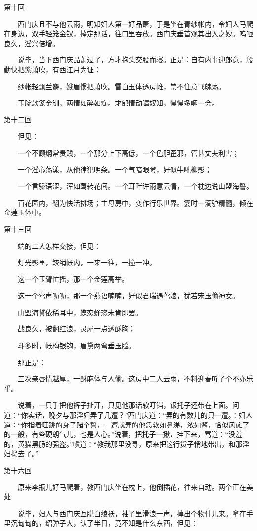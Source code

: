 第十回

　　西门庆且不与他云雨，明知妇人第一好品萧，于是坐在青纱帐内，令妇人马爬在身边，双手轻笼金钗，捧定那话，往口里吞放。西门庆垂首观其出入之妙。呜咂良久，淫兴倍增。


　　说毕，当下西门庆品萧过了，方才抱头交股而寝。正是：自有内事迎郎意，殷勤快把紫萧吹，有西江月为证：

　　纱帐轻飘兰麝，娥眉惯把萧吹。雪白玉体透房帷，禁不住意飞魄荡。

　　玉腕款笼金钏，两情如醉如痴。才郎情动嘱奴知，慢慢多咂一会。


第十二回

　　但见：

　　一个不顾纲常贵贱，一个那分上下高低，一个色胆歪邪，管甚丈夫利害；

　　一个淫心荡漾，从他律犯明条。一个气喑眼瞪，好似牛吼柳影；

　　一个言骄语涩，浑如莺转花间。一个耳畔许雨意云情，一个枕边说山盟海誓。

　　百花园内，翻为快活排场；主母房中，变作行乐世界。霎时一滴驴精髓，倾在金莲玉体中。

第十三回

　　端的二人怎样交接，但见：

　　灯光影里，鲛绡帐内，一来一往，一撞一冲。

　　这一个玉臂忙摇，那一个金莲高举。

　　这一个莺声呖呖，那一个燕语喃喃，好似君瑞遇莺娘，犹若宋玉偷神女。

　　山盟海誓依稀耳中，蝶恋蜂恣未肯即罢。

　　战良久，被翻红浪，灵犀一点透酥胸；

　　斗多时，帐构银钩，眉黛两弯垂玉脸。

　　那正是：

　　三次亲唇情越厚，一酥麻体与人偷。这房中二人云雨，不料迎春听了个不亦乐乎。


　　说着，一只手把他裤子扯开，只见他那话软叮铛，银托子还带在上面。问道：“你实话，晚夕与那淫妇弄了几遭？”西门庆道：“弄的有数儿的只一遭。：妇人道：“你指着旺跳的身子赌个誓，一遭就弄的他恁软如鼻涕，浓如酱，恰似风瘫了的一般，有些硬朗气儿，也是人心。”说着，把托子一揪，挂下来，骂道：“没羞的，黄猫黑肠的强盗。”嗔道：“教我那里没寻，原来把这行货子悄地带出，和那淫妇捣去了。”


第十六回

　　原来李瓶儿好马爬着，教西门庆坐在枕上，他倒插花，往来自动。两个正在美处


　　说毕，妇人与西门庆互脱白绫袄，袖子里滑浪一声，掉出个物什儿来。拿在手里沉甸甸的，绍弹子大，认了半日，竟不知是什么东西，但见：

